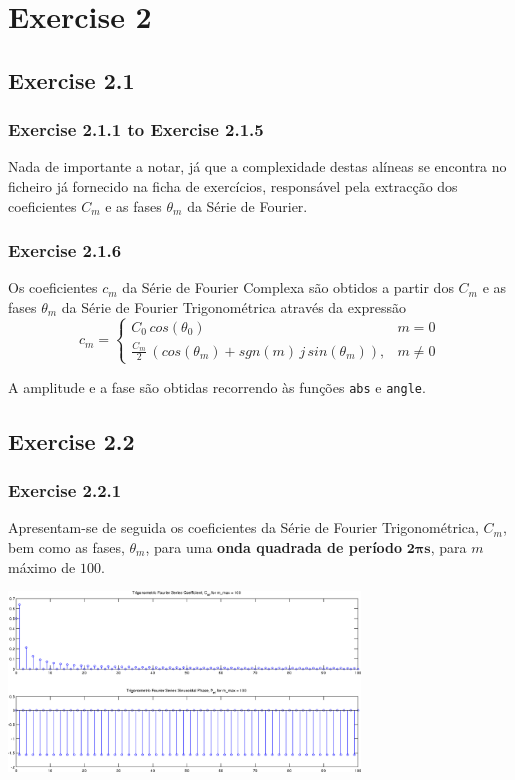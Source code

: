 \documentclass[a4paper]{article}
\begin{document}
\clearpage
\section{Exercise 2}
\subsection{Exercise 2.1}
\subsubsection{Exercise 2.1.1 to Exercise 2.1.5}
\noindent Nada de importante a notar, já que a complexidade destas alíneas se encontra no ficheiro já fornecido na ficha de exercícios, responsável pela extracção dos coeficientes $C_m$ e as fases $\theta_m$ da Série de Fourier.

\subsubsection{Exercise 2.1.6}
\noindent Os coeficientes $c_m$ da Série de Fourier Complexa são obtidos a partir dos $C_m$ e as fases $\theta_m$ da Série de Fourier Trigonométrica através da expressão
\begin{equation}
	c_m = \left\{
	\begin{array}{lr}
		C_0 \, cos(\theta_0) & m = 0 \\
		\frac{C_m}{2} \, (cos(\theta_m) + sgn(m) \, j \, sin(\theta_m)), & m \neq 0
	\end{array}
	\right.
\end{equation}

\noindent A amplitude e a fase são obtidas recorrendo às funções \texttt{abs} e \texttt{angle}.

\subsection{Exercise 2.2}
\label{subsec:ex_2_2}
\subsubsection{Exercise 2.2.1}
\noindent Apresentam-se de seguida os coeficientes da Série de Fourier Trigonométrica, $C_m$, bem como as fases, $\theta_m$, para uma \textbf{onda quadrada de período} $\mathbf{2 \pi s}$, para $m$ máximo de $100$.

\begin{center}
	\includegraphics[width=0.70\textwidth]{images/ex2_2_1_cm_tm.png}
	\label{fig:ex2_2_1_cm_tm}
\end{center}
\end{document}
